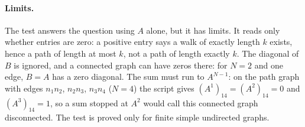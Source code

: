\paragraph{Limits.} The test answers the question using $A$ alone, but it has
limits. It reads only whether entries are zero: a positive entry says a walk of
exactly length $k$ exists, hence a path of length at most $k$, not a path of
length exactly $k$. The diagonal of $B$ is ignored, and a connected graph can
have zeros there: for $N=2$ and one edge, $B=A$ has a zero diagonal. The sum must
run to $A^{N-1}$: on the path graph with edges $n_1n_2$, $n_2n_3$, $n_3n_4$
($N=4$) the script gives $(A^1)_{14}=(A^2)_{14}=0$ and $(A^3)_{14}=1$, so a sum
stopped at $A^2$ would call this connected graph disconnected. The test is proved only for finite simple undirected graphs.
